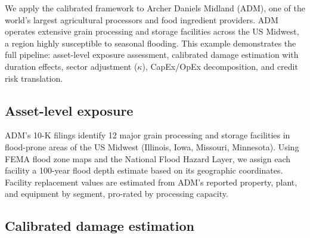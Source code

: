 We apply the calibrated framework to Archer Daniels Midland (ADM), one of the world's largest agricultural processors and food ingredient providers. ADM operates extensive grain processing and storage facilities across the US Midwest, a region highly susceptible to seasonal flooding. This example demonstrates the full pipeline: asset-level exposure assessment, calibrated damage estimation with duration effects, sector adjustment ($\kappa$), CapEx/OpEx decomposition, and credit risk translation.

\subsection{Asset-level exposure}

ADM's 10-K filings identify 12 major grain processing and storage facilities in flood-prone areas of the US Midwest (Illinois, Iowa, Missouri, Minnesota). Using FEMA flood zone maps and the National Flood Hazard Layer, we assign each facility a 100-year flood depth estimate based on its geographic coordinates. Facility replacement values are estimated from ADM's reported property, plant, and equipment by segment, pro-rated by processing capacity.

\begin{table}[h!]
\centering
\small
{}
\caption{ADM facility clusters in flood-prone Midwest locations with estimated 100-year flood parameters. Values estimated from 10-K reported PP\&E.}
\label{tab: adm facilities}
\end{table}

\subsection{Calibrated damage estimation}

